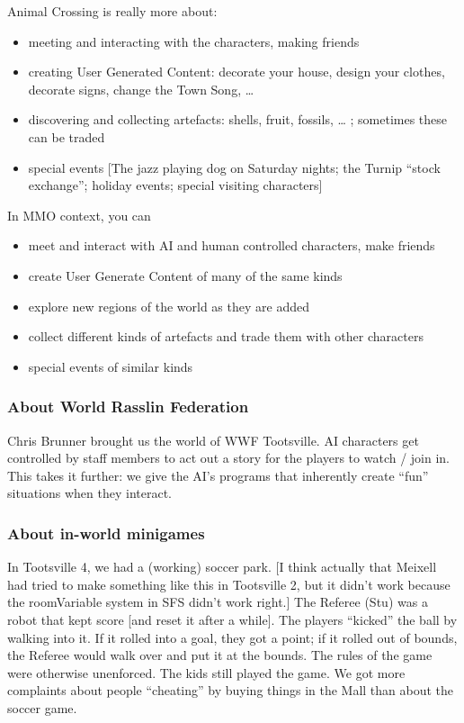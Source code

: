 \documentclass[11pt]{article}
\begin{document}
Animal Crossing is  really more about:

\begin{itemize}
\item meeting and interacting with the characters, making friends

\item creating User Generated Content: decorate your house, design your
clothes, decorate signs, change the Town Song, …

\item discovering and collecting artefacts: shells, fruit, fossils, … ;
sometimes these can be traded

\item special events [The jazz playing dog on Saturday nights; the Turnip
“stock exchange”; holiday events; special visiting characters]
\end{itemize}

In  MMO  context, you  can 

\begin{itemize}
\item meet and interact with AI and human controlled characters, make
friends

\item create User Generate Content of many of the same kinds

\item explore new regions of the world as they are added

\item collect different kinds of artefacts and trade them with other
characters

\item special events of similar kinds
\end{itemize}
\subsubsection{About World Rasslin Federation}
\label{sec-1-1-4}

Chris Brunner  brought us the  world of WWF Tootsville.  AI characters
get controlled by staff members to act  out a story for the players to
watch / join in. This takes it further: we give the AI's programs that
inherently create “fun” situations when they interact.
\subsubsection{About in-world minigames}
\label{sec-1-1-5}

In Tootsville  4, we had  a (working)  soccer park. [I  think actually
that Meixell  had tried to make  something like this in  Tootsville 2,
but it didn't work because the  roomVariable system in SFS didn't work
right.] The  Referee (Stu) was a  robot that kept score  [and reset it
after a while].  The players “kicked” the ball by  walking into it. If
it rolled into a  goal, they got a point; if it  rolled out of bounds,
the Referee would walk over and put it at the bounds. The rules of the
game were otherwise unenforced. The kids still played the game. We got
more complaints about  people “cheating” by buying things  in the Mall
than about the soccer game.
\end{document}
